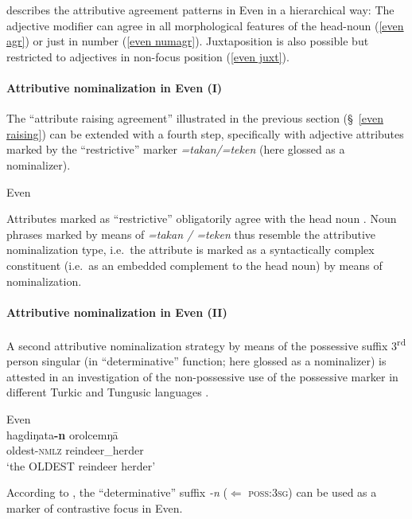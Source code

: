 \citet[30–31]{malchukov1995} describes the attributive agreement patterns in Even in a hierarchical way: The adjective modifier can agree in all morphological features of the head-noun (\ref{even agr}) or just in number (\ref{even numagr}). Juxtaposition is also possible but restricted to adjectives in non-focus position (\ref{even juxt}).

\paragraph{Attributive nominalization in Even (I)}
The “attribute raising agreement” illustrated in the previous section (\S~\ref{even raising}) can be extended with a fourth step, specifically with adjective attributes marked by the “restrictive” marker \textit{=takan/=teken} (here glossed as a nominalizer).
\begin{exe}
\ex 
\rm{Even \citep[32]{malchukov1995}}
\begin{xlist}
\end{xlist}
\end{exe}
Attributes marked as “restrictive” obligatorily agree with the head noun \cite[32]{malchukov1995}. Noun phrases marked by means of \textit{=takan / =teken} thus resemble the attributive nominalization type, i.e.~the attribute is marked as a syntactically complex constituent (i.e.~as an embedded complement to the head noun) by means of nominalization.

\paragraph{Attributive nominalization in Even (II)}
A second attributive nominalization strategy by means of the possessive suffix 3\textsuperscript{rd} person singular (in “determinative” function; here glossed as a nominalizer) is attested in an investigation of the non-possessive use of the possessive marker in different Turkic and Tungusic languages \citep{benzing1993b}.
\begin{exe}
\ex 
\rm{Even \citep[17–18 Footnote 58]{benzing1993b}}\\
\gll	hagdiŋata\textbf{-n} orolcemŋā\\
	oldest-\textsc{nmlz} reindeer\_herder\\
\glt	‘the OLDEST reindeer herder’
\end{exe}
According to \cite[17–18 Footnote 58]{benzing1993b}, the “determinative” suffix {\it -n} ($\Leftarrow$ \textsc{poss:3sg}) can be used as a marker of contrastive focus in Even.

